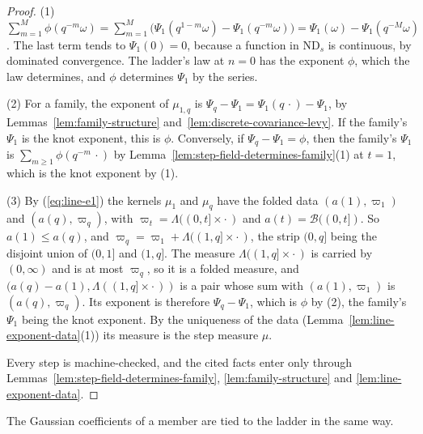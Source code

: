 \begin{proof}
\leanok
{}
(1) $\sum_{m=1}^M\phi(q^{-m}\omega) = \sum_{m=1}^M\bigl(\Psi_1(q^{1-m}\omega) - \Psi_1(q^{-m}\omega)\bigr)
= \Psi_1(\omega) - \Psi_1(q^{-M}\omega)$. The last term tends to $\Psi_1(0) = 0$, because a function
in $\mathrm{ND}_s$ is continuous, by dominated convergence. The ladder's law at $n = 0$ has the
exponent $\phi$, which the law determines, and $\phi$ determines $\Psi_1$ by the series.

(2) For a family, the exponent of $\mu_{1,q}$ is $\Psi_q - \Psi_1 = \Psi_1(q\,\cdot) - \Psi_1$, by
Lemmas~\ref{lem:family-structure} and~\ref{lem:discrete-covariance-levy}. If the family's
$\Psi_1$ is the knot exponent, this is $\phi$. Conversely, if $\Psi_q - \Psi_1 = \phi$, then the
family's $\Psi_1$ is $\sum_{m \ge 1}\phi(q^{-m}\,\cdot)$ by
Lemma~\ref{lem:step-field-determines-family}(1) at $t = 1$, which is the knot exponent by (1).

(3) By (\ref{eq:line-e1}) the kernels $\mu_1$ and $\mu_q$ have the folded data $(a(1), \varpi_1)$ and
$(a(q), \varpi_q)$, with $\varpi_t = \Lambda((0,t] \times \cdot\,)$ and $a(t) = \mathcal{B}((0,t])$.
So $a(1) \le a(q)$, and $\varpi_q = \varpi_1 + \Lambda((1,q] \times \cdot\,)$, the strip
$(0,q]$ being the disjoint union of $(0,1]$ and $(1,q]$. The measure $\Lambda((1,q] \times \cdot\,)$
is carried by $(0,\infty)$ and is at most $\varpi_q$, so it is a folded \Levy{} measure, and
$(a(q) - a(1), \Lambda((1,q] \times \cdot\,))$ is a pair whose sum with $(a(1), \varpi_1)$ is
$(a(q), \varpi_q)$. Its exponent is therefore $\Psi_q - \Psi_1$, which is $\phi$ by (2), the
family's $\Psi_1$ being the knot exponent. By the uniqueness of the data
(Lemma~\ref{lem:line-exponent-data}(1)) its measure is the step measure $\mu$.

Every step is machine-checked, and the cited facts enter only through
Lemmas~\ref{lem:step-field-determines-family}, \ref{lem:family-structure} and
\ref{lem:line-exponent-data}.
\end{proof}

The Gaussian coefficients of a member are tied to the ladder in the same way.

